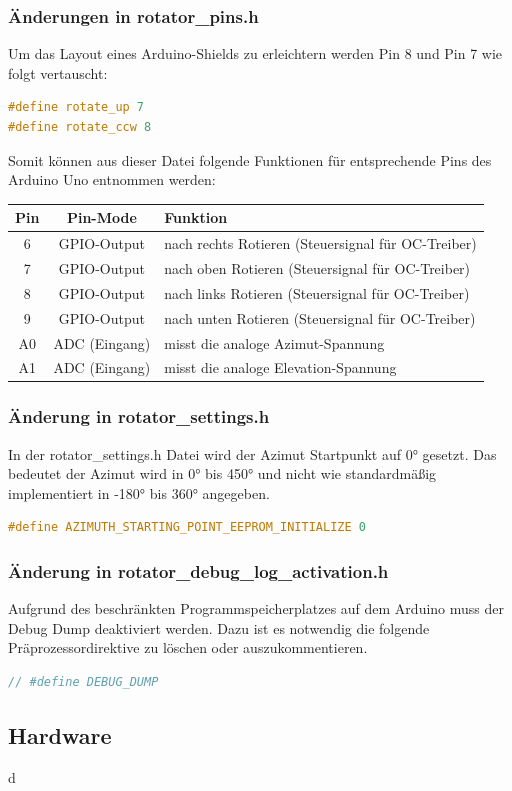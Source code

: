 \subsubsection{Änderungen in rotator\_pins.h}
Um das Layout eines Arduino-Shields zu erleichtern werden Pin 8 und Pin 7 wie folgt vertauscht:
\begin{lstlisting}[language=C++]
#define rotate_up 7
#define rotate_ccw 8
\end{lstlisting}

Somit können aus dieser Datei folgende Funktionen für entsprechende Pins des Arduino Uno entnommen werden:

\begin{tabular}{| c | c | l |}
	\hline
	\textbf{Pin} & \textbf{Pin-Mode} & \textbf{Funktion} \\
	\hline
	6 & GPIO-Output & nach rechts Rotieren (Steuersignal für OC-Treiber) \\
	\hline
	7 & GPIO-Output & nach oben Rotieren (Steuersignal für OC-Treiber) \\
	\hline
	8 & GPIO-Output & nach links Rotieren (Steuersignal für OC-Treiber) \\
	\hline
	9 & GPIO-Output & nach unten Rotieren (Steuersignal für OC-Treiber) \\
	\hline
	A0 & ADC (Eingang) & misst die analoge Azimut-Spannung \\
	\hline
	A1 & ADC (Eingang) & misst die analoge Elevation-Spannung \\
	\hline
\end{tabular}

\subsubsection{Änderung in rotator\_settings.h}
In der rotator\_settings.h Datei wird der Azimut Startpunkt auf 0° gesetzt. Das bedeutet der Azimut wird in 0° bis 450° und nicht wie standardmäßig implementiert in -180° bis 360° angegeben.
\begin{lstlisting}[language=C++]
#define AZIMUTH_STARTING_POINT_EEPROM_INITIALIZE 0
\end{lstlisting}

\subsubsection{Änderung in rotator\_debug\_log\_activation.h}
Aufgrund des beschränkten Programmspeicherplatzes auf dem Arduino muss der Debug Dump deaktiviert werden. Dazu ist es notwendig die folgende Präprozessordirektive zu löschen oder auszukommentieren.
\begin{lstlisting}[language=C++]
// #define DEBUG_DUMP
\end{lstlisting}

\subsection{Hardware}
d



